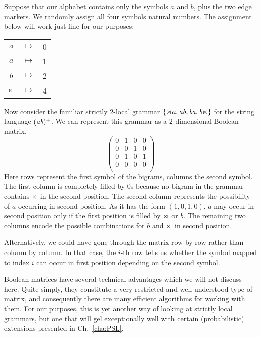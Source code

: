 \begin{examplebox}
    Suppose that our alphabet contains only the symbols $a$ and $b$, plus the two edge markers.
    We randomly assign all four symbols natural numbers.
    The assignment below will work just fine for our purposes:
    \begin{center}
        \begin{tabular}{ccc}
            $\rtimes$  & $\mapsto$ & 0\\
            $a$          & $\mapsto$ & 1\\
            $b$          & $\mapsto$ & 2\\
            $\ltimes$ & $\mapsto$ & 4
        \end{tabular}
    \end{center}
    Now consider the familiar strictly $2$-local grammar $\left \{ \mathit{\rtimes a}, \mathit{ab}, \mathit{ba}, \mathit{b \ltimes} \right \}$ for the string language $(\mathit{ab})^+$.
    We can represent this grammar as a $2$-dimensional Boolean matrix.
    \[
        \begin{pmatrix}
            0 & 1 & 0 & 0\\
            0 & 0 & 1 & 0\\
            0 & 1 & 0 & 1\\
            0 & 0 & 0 & 0\\
        \end{pmatrix}
    \]
    Here rows represent the first symbol of the bigrams, columns the second symbol.
    The first column is completely filled by 0s because no bigram in the grammar contains $\rtimes$ in the second position.
    The second column represents the possibility of $a$ occurring in second position.
    As it has the form $(1,0,1,0)$, $a$ may occur in second position only if the first position is filled by $\rtimes$ or $b$.
    The remaining two columns encode the possible combinations for $b$ and $\ltimes$ in second position.

    Alternatively, we could have gone through the matrix row by row rather than column by column.
    In that case, the $i$-th row tells us whether the symbol mapped to index $i$ can occur in first position depending on the second symbol.
\end{examplebox}
%
Boolean matrices have several technical advantages which we will not discuss here.
Quite simply, they constitute a very restricted and well-understood type of matrix, and consequently there are many efficient algorithms for working with them.
For our purposes, this is yet another way of looking at strictly local grammars, but one that will gel exceptionally well with certain (probabilistic) extensions presented in Ch.~\ref{cha:PSL}.

